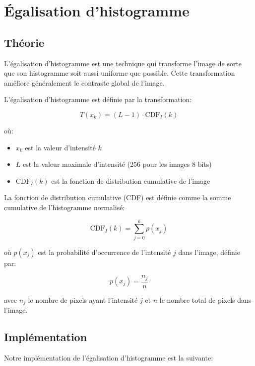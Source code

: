 \documentclass[12pt,a4paper]{article}
\begin{document}
\section{Égalisation d'histogramme}

\subsection{Théorie}

L'égalisation d'histogramme est une technique qui transforme l'image de sorte que son histogramme soit aussi uniforme que possible. Cette transformation améliore généralement le contraste global de l'image.

L'égalisation d'histogramme est définie par la transformation:

\begin{equation}
    T(x_k) = (L-1) \cdot \text{CDF}_I(k)
\end{equation}

où:
\begin{itemize}
    \item $x_k$ est la valeur d'intensité $k$
    \item $L$ est la valeur maximale d'intensité (256 pour les images 8 bits)
    \item $\text{CDF}_I(k)$ est la fonction de distribution cumulative de l'image
\end{itemize}

La fonction de distribution cumulative (CDF) est définie comme la somme cumulative de l'histogramme normalisé:

\begin{equation}
    \text{CDF}_I(k) = \sum_{j=0}^{k} p(x_j)
\end{equation}

où $p(x_j)$ est la probabilité d'occurrence de l'intensité $j$ dans l'image, définie par:

\begin{equation}
    p(x_j) = \frac{n_j}{n}
\end{equation}

avec $n_j$ le nombre de pixels ayant l'intensité $j$ et $n$ le nombre total de pixels dans l'image.

\subsection{Implémentation}

Notre implémentation de l'égalisation d'histogramme est la suivante:
\end{document}
